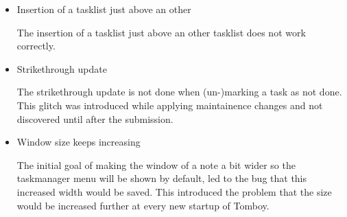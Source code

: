 \begin{itemize}
\item Insertion of a tasklist just above an other

  The insertion of a tasklist just above an other tasklist does not work correctly.

\item Strikethrough update
  
  The strikethrough update is not done when (un-)marking a task as not done.
  This glitch was introduced while applying maintainence changes and not discovered until after the submission.

\item Window size keeps increasing

  The initial goal of making the window of a note a bit wider so the taskmanager menu will be shown by default, led to the bug that this increased width would be saved. This introduced the problem that the size would be increased further at every new startup of Tomboy.

\end{itemize}